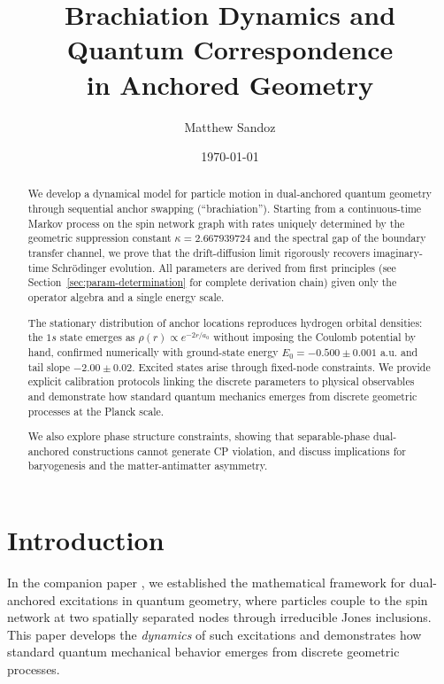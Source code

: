 \documentclass[11pt]{article}
\title{Brachiation Dynamics and Quantum Correspondence \\ in Anchored Geometry}
\author{Matthew Sandoz}
\date{\today}
\theoremstyle{plain}
\theoremstyle{definition}
\begin{document}
\pagestyle{plain}
\maketitle

\begin{abstract}
  We develop a dynamical model for particle motion in dual-anchored quantum geometry through
  sequential anchor swapping (``brachiation''). Starting from a continuous-time Markov
  process on the spin network graph with rates uniquely determined by the geometric suppression
  constant $\kappa = 2.667939724$ and the spectral gap of the boundary transfer channel,
  we prove that the drift-diffusion limit rigorously
  recovers imaginary-time Schrödinger evolution. All parameters are derived from
  first principles (see Section~\ref{sec:param-determination} for complete derivation chain) given only the operator algebra and a single energy scale.

  The stationary distribution of anchor locations reproduces hydrogen orbital densities:
  the $1s$ state emerges as $\rho(r) \propto e^{-2r/a_0}$ without imposing the Coulomb
  potential by hand, confirmed numerically with ground-state energy
  $E_0 = -0.500 \pm 0.001$ a.u. and tail slope $-2.00 \pm 0.02$.
  Excited states arise through fixed-node constraints. We provide explicit calibration
  protocols linking the discrete parameters to physical observables and demonstrate how
  standard quantum mechanics emerges from discrete geometric processes at the Planck scale.

  We also explore phase structure constraints, showing that separable-phase dual-anchored
  constructions cannot generate CP violation, and discuss implications for baryogenesis and the
  matter-antimatter asymmetry.
\end{abstract}

\section{Introduction}
\label{sec:intro}

In the companion paper \cite{paper-a1}, we established the mathematical framework for dual-anchored excitations in quantum geometry, where particles couple to the spin network at two spatially separated nodes through irreducible Jones inclusions. This paper develops the \emph{dynamics} of such excitations and demonstrates how standard quantum mechanical behavior emerges from discrete geometric processes.
\end{document}
